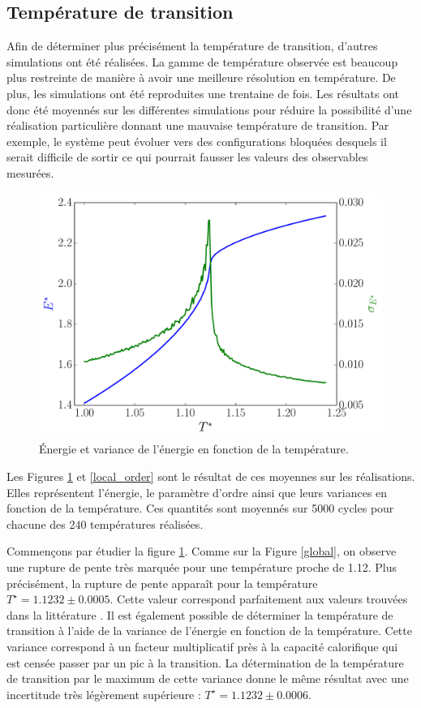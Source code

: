 \documentclass[11pt,a4paper]{article}
\numberwithin{equation}{section}
\begin{document}
\subsection{Température de transition}
\label{temptrans}
Afin de déterminer plus précisément la température de transition, d'autres simulations ont été réalisées. La gamme de température observée est beaucoup plus restreinte de manière à avoir une meilleure résolution en température. De plus, les simulations ont été reproduites une trentaine de fois. Les résultats ont donc été moyennés sur les différentes simulations pour réduire la possibilité d'une réalisation particulière donnant une mauvaise température de transition.  Par exemple, le système peut évoluer vers des configurations bloquées desquels il serait difficile de sortir ce qui pourrait fausser les valeurs des observables mesurées.   

\begin{figure}[h!]
    \centering	    
	\includegraphics[scale=0.6]{figures/local_energie.pdf}
    \caption{Énergie et variance de l'énergie en fonction de la température.}
    	\label{local_energie} 
\end{figure}

Les Figures \ref{local_energie} et \ref{local_order} sont le résultat de ces moyennes sur les réalisations. Elles représentent l'énergie, le paramètre d'ordre ainsi que leurs variances en fonction de la température. Ces quantités sont moyennés sur 5000 cycles pour chacune des 240 températures réalisées.
\medskip

Commençons par étudier la figure \ref{local_energie}. Comme sur la Figure \ref{global}, on observe une rupture de pente très marquée pour une température proche de 1.12. Plus précisément, la rupture de pente apparaît pour la température $T^\star = 1.1232 \pm 0.0005$. Cette valeur correspond parfaitement aux valeurs trouvées dans la littérature \cite{fabbri,wfo, parallel, badass}. Il est également possible de déterminer la température de transition à l'aide de la variance de l'énergie en fonction de la température. Cette variance correspond à un facteur multiplicatif près à la capacité calorifique qui est censée passer par un pic à la transition. La détermination de la température de transition par le maximum de cette variance donne le même résultat avec une incertitude très légèrement supérieure : $T^\star = 1.1232 \pm 0.0006$.
\end{document}
